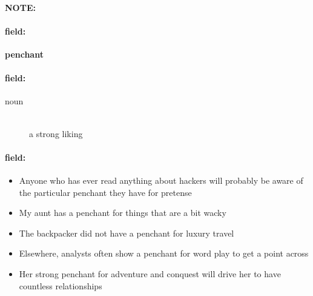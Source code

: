 \documentclass[12pt]{article}
\newenvironment{note}{\paragraph{NOTE:}}{}
\newenvironment{field}{\paragraph{field:}}{}
\begin{document}
\begin{note}
\begin{field}
\textbf{\large penchant}
\end{field}


\begin{field}
\begin{description}
\item[noun] \hfill \\ 
a strong liking

\end{description}
\end{field}

\begin{field}
\begin{itemize}
\item Anyone who has ever read anything about hackers will probably be aware of the particular penchant they have for pretense
\item My aunt has a penchant for things that are a bit wacky
\item The backpacker did not have a penchant for luxury travel
\item Elsewhere, analysts often show a penchant for word play to get a point across
\item Her strong penchant for adventure and conquest will drive her to have countless relationships
\end{itemize}
\end{field}
\end{note}
\end{document}
